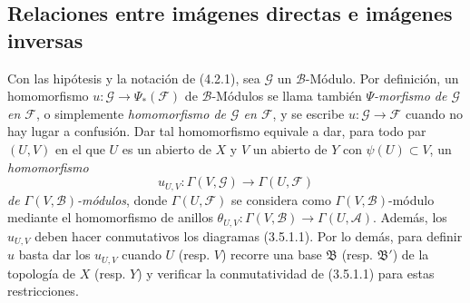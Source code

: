 \subsection{Relaciones entre imágenes directas e imágenes inversas}
\label{subsection:0.4.4-fr}

\begin{env}[4.4.1]
\label{0.4.4.1-fr}
Con las hipótesis y la notación de (4.2.1), sea $\mathcal{G}$ un
$\mathcal{B}$-Módulo. Por definición, un homomorfismo
$u:\mathcal{G}\to\Psi_*(\mathcal{F})$ de $\mathcal{B}$-Módulos se llama
también \emph{$\Psi$-morfismo de $\mathcal{G}$ en $\mathcal{F}$}, o
simplemente \emph{homomorfismo de $\mathcal{G}$ en $\mathcal{F}$}, y se
escribe $u:\mathcal{G}\to\mathcal{F}$ cuando no hay lugar a confusión.
Dar tal homomorfismo equivale a dar, para todo par $(U,V)$ en el que
$U$ es un abierto de $X$ y $V$ un abierto de $Y$ con
$\psi(U)\subset V$, un \emph{homomorfismo}
\[
  u_{U,V}:\Gamma(V,\mathcal{G})\longrightarrow\Gamma(U,\mathcal{F})
\]
\emph{de $\Gamma(V,\mathcal{B})$-módulos}, donde $\Gamma(U,\mathcal{F})$
se considera como $\Gamma(V,\mathcal{B})$-módulo mediante el homomorfismo
de anillos
$\theta_{U,V}:\Gamma(V,\mathcal{B})\to\Gamma(U,\mathcal{A})$. Además,
los $u_{U,V}$ deben hacer conmutativos los diagramas (3.5.1.1). Por lo demás,
para definir $u$ basta dar los $u_{U,V}$ cuando $U$ (resp. $V$) recorre
una base $\mathfrak{B}$ (resp. $\mathfrak{B}'$) de la topología de $X$
(resp. $Y$) y verificar la conmutatividad de (3.5.1.1) para estas
restricciones.
\end{env}
